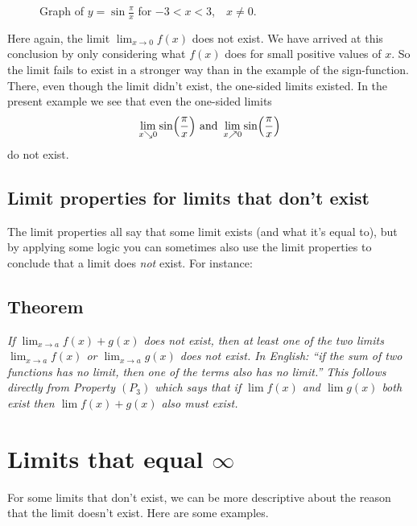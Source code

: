 \begin{figure}[ht]\centering
  
  \caption{Graph of $y = \sin\frac\pi x$ for $-3<x<3$,\ \ $x\neq0$.}
  \label{fig:03sinePiOverx}
\end{figure}

Here again, the limit $\lim_{x\to0}f(x)$ does not exist.  We have arrived
at this conclusion by only considering what $f(x)$ does for small positive
values of $x$.  So the limit fails to exist in a stronger way than in the
example of the sign-function. There, even though the limit didn't exist,
the one-sided limits existed.  In the present example we see that even the
one-sided limits
\[
  \lim_{x\searrow 0} \sin \Bigl(\frac{\pi}{x} \Bigr)
  \text{ and }
  \lim_{x\nearrow 0} \sin \Bigl(\frac{\pi}{x} \Bigr)
\]
do not exist.
\subsection{Limit properties for limits that don't exist} 
The limit properties all say that some limit exists (and what it's equal to),
but by applying some logic you can sometimes also use the limit properties to
conclude that a limit does \emph{not} exist.  For instance:
\subsection*{Theorem}%
\itshape
If $\lim_{x\to a}f(x) + g(x)$ does not exist, then at least one of the
two limits $\lim_{x\to a}f(x)$ or $\lim_{x\to a}g(x)$ does not exist.
\upshape\medskip
\noindent%
In English: ``if the sum of two functions has no limit, then one of
the terms also has no limit.''
This follows directly from Property $(P_3)$ which says that if $\lim
f(x)$ and $\lim g(x) $ both exist then $\lim f(x)+g(x)$ also must
exist.
\section{Limits that equal $\infty$} 
\label{sec:03limits-that-equal-infty}
For some limits that don't exist, we can be more descriptive about the
reason that the limit doesn't exist.  Here are some examples.

